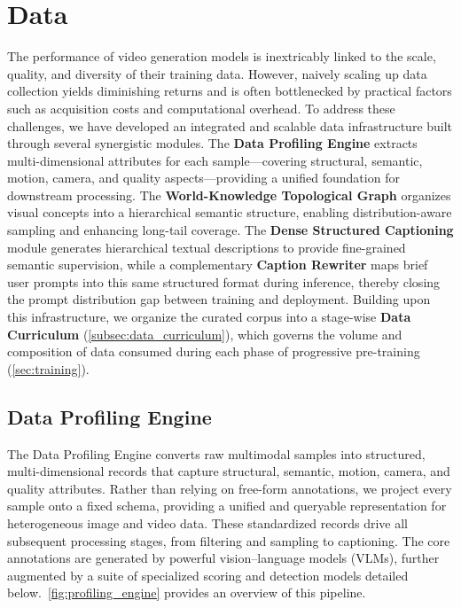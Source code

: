 \section{Data} \label{sec:data}
The performance of video generation models is inextricably linked to the scale, quality, and diversity of their training data.
However, naively scaling up data collection yields diminishing returns and is often bottlenecked by practical factors such as acquisition costs and computational overhead.
To address these challenges, we have developed an integrated and scalable data infrastructure built through several synergistic modules.
The \textbf{Data Profiling Engine} extracts multi-dimensional attributes for each sample---covering structural, semantic, motion, camera, and quality aspects---providing a unified foundation for downstream processing.
The \textbf{World-Knowledge Topological Graph} organizes visual concepts into a hierarchical semantic structure, enabling distribution-aware sampling and enhancing long-tail coverage.
The \textbf{Dense Structured Captioning} module generates hierarchical textual descriptions to provide fine-grained semantic supervision, while a complementary \textbf{Caption Rewriter} maps brief user prompts into this same structured format during inference, thereby closing the prompt distribution gap between training and deployment.
Building upon this infrastructure, we organize the curated corpus into a stage-wise \textbf{Data Curriculum} (\cref{subsec:data_curriculum}), which governs the volume and composition of data consumed during each phase of progressive pre-training (\cref{sec:training}).

\subsection{Data Profiling Engine}
The Data Profiling Engine converts raw multimodal samples into structured, multi-dimensional records that capture structural, semantic, motion, camera, and quality attributes. Rather than relying on free-form annotations, we project every sample onto a fixed schema, providing a unified and queryable representation for heterogeneous image and video data. These standardized records drive all subsequent processing stages, from filtering and sampling to captioning. The core annotations are generated by powerful vision--language models (VLMs), further augmented by a suite of specialized scoring and detection models detailed below.~\cref{fig:profiling_engine} provides an overview of this pipeline.

